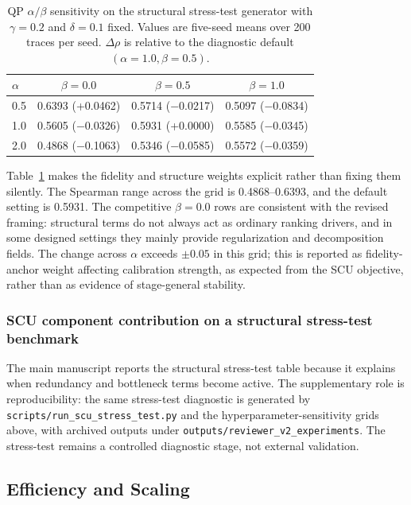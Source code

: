 \documentclass[a4paper,fleqn]{cas-sc}
\begin{document}
\begin{table}[ht]
\caption{QP $\alpha/\beta$ sensitivity on the structural stress-test generator with $\gamma=0.2$ and $\delta=0.1$ fixed. Values are five-seed means over 200 traces per seed. $\Delta\rho$ is relative to the diagnostic default $(\alpha=1.0,\beta=0.5)$.}
\label{tab:supp-alpha-beta-sensitivity}
\centering
\small
\begin{tabular}{lccc}
\toprule
\textbf{$\alpha$} & \textbf{$\beta=0.0$} & \textbf{$\beta=0.5$} & \textbf{$\beta=1.0$} \\
\midrule
0.5 & 0.6393 (+0.0462) & 0.5714 ($-$0.0217) & 0.5097 ($-$0.0834) \\
1.0 & 0.5605 ($-$0.0326) & 0.5931 (+0.0000) & 0.5585 ($-$0.0345) \\
2.0 & 0.4868 ($-$0.1063) & 0.5346 ($-$0.0585) & 0.5572 ($-$0.0359) \\
\bottomrule
\end{tabular}
\end{table}

Table~\ref{tab:supp-alpha-beta-sensitivity} makes the fidelity and structure weights explicit rather than fixing them silently. The Spearman range across the grid is 0.4868--0.6393, and the default setting is 0.5931. The competitive $\beta=0.0$ rows are consistent with the revised framing: structural terms do not always act as ordinary ranking drivers, and in some designed settings they mainly provide regularization and decomposition fields. The change across $\alpha$ exceeds $\pm 0.05$ in this grid; this is reported as fidelity-anchor weight affecting calibration strength, as expected from the SCU objective, rather than as evidence of stage-general stability.

\subsubsection{SCU component contribution on a structural stress-test benchmark}

The main manuscript reports the structural stress-test table because it explains when redundancy and bottleneck terms become active. The supplementary role is reproducibility: the same stress-test diagnostic is generated by \texttt{scripts/run\_scu\_stress\_test.py} and the hyperparameter-sensitivity grids above, with archived outputs under \texttt{outputs/reviewer\_v2\_experiments}. The stress-test remains a controlled diagnostic stage, not external validation.

\subsection{Efficiency and Scaling}
\label{app:efficiency-scaling}
\end{document}
